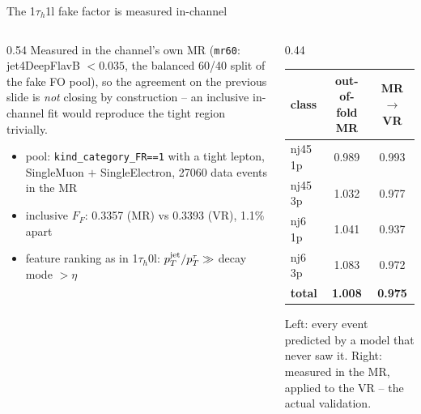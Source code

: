 \documentclass[aspectratio=169,10pt]{beamer}
\begin{document}
\begin{frame}{The 1$\tau_h$1l fake factor is measured in-channel}
  \footnotesize
  \begin{columns}[T]
    \begin{column}{0.54\textwidth}
      Measured in the channel's own MR (\texttt{mr60}: jet4DeepFlavB $<0.035$,
      the balanced 60/40 split of the fake FO pool), so the agreement on the
      previous slide is \emph{not} closing by construction -- an inclusive
      in-channel fit would reproduce the tight region trivially.
      \vspace{0.3em}
      \begin{itemize}\itemsep2pt
        \item pool: \texttt{kind\_category\_FR==1} with a tight lepton,
          SingleMuon $+$ SingleElectron, 27060 data events in the MR
        \item inclusive $F_F$: 0.3357 (MR) vs 0.3393 (VR), 1.1\% apart
        \item feature ranking as in 1$\tau_h$0l:
          $p_T^{\rm jet}/p_T^{\tau}\gg$ decay mode $>\eta$
      \end{itemize}
    \end{column}
    \begin{column}{0.44\textwidth}
      \centering
      \begin{tabular}{lcc}
        \toprule
        class & out-of-fold MR & MR $\to$ VR \\
        \midrule
        nj45 1p & 0.989 & 0.993 \\
        nj45 3p & 1.032 & 0.977 \\
        nj6 1p  & 1.041 & 0.937 \\
        nj6 3p  & 1.083 & 0.972 \\
        \midrule
        \textbf{total} & \textbf{1.008} & \textbf{0.975} \\
        \bottomrule
      \end{tabular}
      \vspace{0.4em}
      {\scriptsize Left: every event predicted by a model that never saw it.
      Right: measured in the MR, applied to the VR -- the actual validation.}
    \end{column}
  \end{columns}
\end{frame}

\end{document}
